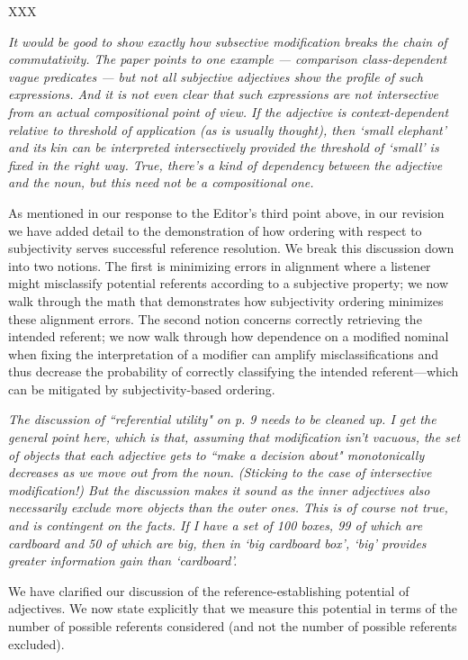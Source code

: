 \documentclass[12pt]{article}
\begin{document}
XXX

\item \emph{It would be good to show exactly how subsective modification breaks the chain of commutativity.  The paper points to one example --- comparison
class-dependent vague predicates --- but not all subjective adjectives show
the profile of such expressions.  And it is not even clear that such
expressions are not intersective from an actual compositional point of view.
If the adjective is context-dependent relative to threshold of application
(as is usually thought), then `small elephant' and its kin can be
interpreted intersectively provided the threshold of `small' is fixed in the
right way.  True, there's a kind of dependency between the adjective and the
noun, but this need not be a compositional one.}

As mentioned in our response to the Editor's third point above, in our revision we have added detail to the demonstration of how ordering with respect to subjectivity serves successful reference resolution. We break this discussion down into two notions. The first is minimizing errors in alignment where a listener might misclassify potential referents according to a subjective property; we now walk through the math that demonstrates how subjectivity ordering minimizes these alignment errors. The second notion concerns correctly retrieving the intended referent; we now walk through how dependence on a modified nominal when fixing the interpretation of a modifier can amplify misclassifications and thus decrease the probability of correctly classifying the intended referent---which can be mitigated by subjectivity-based ordering.

\item \emph{The discussion of ``referential utility" on p. 9 needs to be cleaned up. 
I get the general point here, which is that, assuming that modification
isn't vacuous, the set of objects that each adjective gets to ``make a
decision about" monotonically decreases as we move out from the noun. 
(Sticking to the case of intersective modification!)  But the discussion
makes it sound as the inner adjectives also necessarily exclude more objects
than the outer ones.  This is of course not true, and is contingent on the
facts.  If I have a set of 100 boxes, 99 of which are cardboard and 50 of
which are big, then in `big cardboard box', `big' provides greater
information gain than `cardboard'.}

We have clarified our discussion of the reference-establishing potential of adjectives. We now state explicitly that we measure this potential in terms of the number of possible referents considered (and not the number of possible referents excluded).
\end{document}
